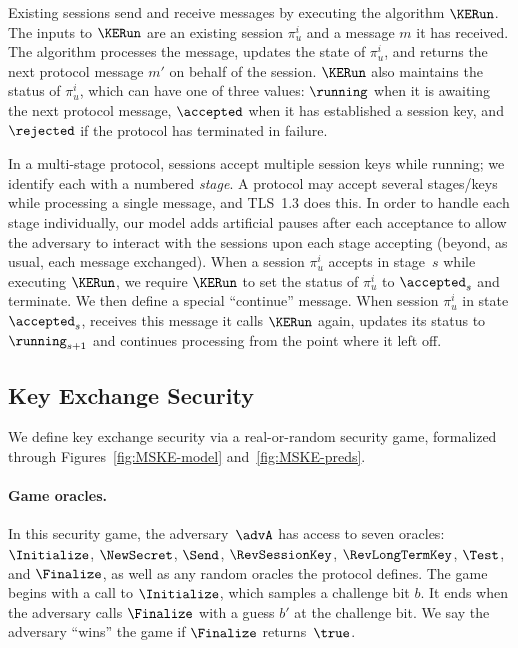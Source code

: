 Existing sessions send and receive messages by executing the algorithm $\KERun$.
The inputs to $\KERun$ are an existing session $\pi_u^i$ and a message $m$ it has received. 
The algorithm processes the message, updates the state of $\pi_u^i$, and returns the next protocol message $m'$ on behalf of the session. 
$\KERun$ also maintains the status of $\pi_u^i$, which can have one of three values: $\running$ when it is awaiting the next protocol message, $\accepted$ when it has established a session key, and $\rejected$ if the protocol has terminated in failure.

In a multi-stage protocol, sessions accept multiple session keys while running; we identify each with a numbered \emph{stage}.
A protocol may accept several stages/keys while processing a single message, and TLS~1.3 does this.
In order to handle each stage individually, our model adds artificial pauses after each acceptance to allow the adversary to interact with the sessions upon each stage accepting (beyond, as usual, each message exchanged).
When a session $\pi_u^i$ accepts in stage~$s$ while executing $\KERun$, we require $\KERun$ to set the status of $\pi_u^i$ to $\accepted_{s}$ and terminate.
We then define a special ``continue'' message. 
When session $\pi_u^i$ in state $\accepted_{s}$, receives this message it calls $\KERun$ again, updates its status to $\running_{s+1}$ and continues processing from the point where it left off.

\iffull
{}
\fi

\subsection{Key Exchange Security}

We define key exchange security via a real-or-random security game, formalized through Figures~\ref{fig:MSKE-model} and~\ref{fig:MSKE-preds}.




\paragraph{Game oracles.}
In this security game, the adversary~$\advA$ has access to seven oracles: $\Initialize$, $\NewSecret$, $\Send$, $\RevSessionKey$, $\RevLongTermKey$, $\Test$, and $\Finalize$, as well as any random oracles the protocol defines.
The game begins with a call to $\Initialize$, which samples a challenge bit $b$. 
It ends when the adversary calls $\Finalize$ with a guess $b'$ at the challenge bit.
We say the adversary ``wins'' the game if $\Finalize$ returns~$\true$.

